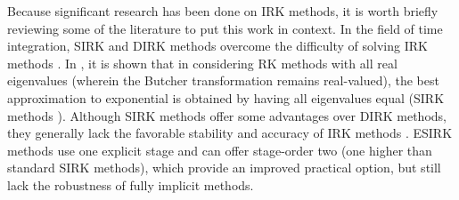 \documentclass[review]{siamart}
\begin{document}
Because significant research has been done on IRK methods, it is worth briefly
reviewing some of the literature to put this work in context. In the field of time
integration, SIRK and DIRK methods overcome the difficulty of solving IRK methods
\cite{alexander1977diagonally,norsett1976runge}.
In \cite{orel91}, it is shown that in considering RK methods with all real eigenvalues
(wherein the Butcher transformation \cite{butcher76} remains real-valued), the best
approximation to exponential is obtained by having all eigenvalues equal (SIRK
methods \cite{norsett1976runge}).
Although SIRK methods offer some advantages over DIRK methods, they generally lack
the favorable stability and accuracy of IRK methods \cite{burrage82,orel91}. ESIRK methods
use one explicit stage and can offer stage-order two \cite{butcher00} (one higher
than standard SIRK methods), which provide an improved practical option, but still
lack the robustness of fully implicit methods.






\end{document}
